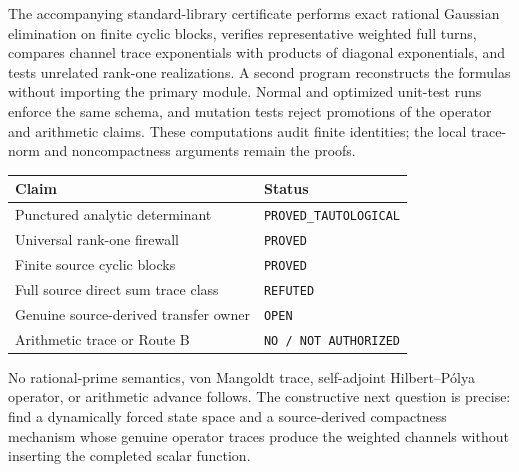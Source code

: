 \documentclass[11pt]{article}
\begin{document}
The accompanying standard-library certificate performs exact rational
Gaussian elimination on finite cyclic blocks, verifies representative
weighted full turns, compares channel trace exponentials with products of
diagonal exponentials, and tests unrelated rank-one realizations.  A second
program reconstructs the formulas without importing the primary module.
Normal and optimized unit-test runs enforce the same schema, and mutation
tests reject promotions of the operator and arithmetic claims.  These
computations audit finite identities; the local trace-norm and noncompactness
arguments remain the proofs.

\begin{center}
\begin{tabular}{@{}ll@{}}
\toprule
Claim & Status\\
\midrule
Punctured analytic determinant & \texttt{PROVED\_TAUTOLOGICAL}\\
Universal rank-one firewall & \texttt{PROVED}\\
Finite source cyclic blocks & \texttt{PROVED}\\
Full source direct sum trace class & \texttt{REFUTED}\\
Genuine source-derived transfer owner & \texttt{OPEN}\\
Arithmetic trace or Route B & \texttt{NO / NOT AUTHORIZED}\\
\bottomrule
\end{tabular}
\end{center}

No rational-prime semantics, von Mangoldt trace, self-adjoint
Hilbert--P\'olya operator, or arithmetic advance follows.  The constructive
next question is precise: find a dynamically forced state space and a
source-derived compactness mechanism whose genuine operator traces produce
the weighted channels without inserting the completed scalar function.



\end{document}
